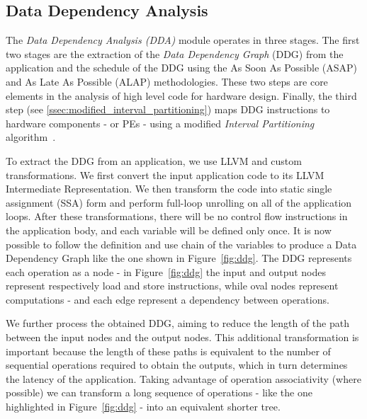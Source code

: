 \vspace{-1mm}
\subsection{Data Dependency Analysis}
\label{ssec:dda}
\vspace{-1mm}
The \textit{Data Dependency Analysis (DDA)} module operates in three stages. The first two stages are the extraction of the \textit{Data Dependency Graph} (DDG)\cite{isoda1983global} from the application and the schedule of the DDG using the As Soon As Possible (ASAP) and As Late As Possible (ALAP) methodologies. These two steps are core elements in the analysis of high level code for hardware design\cite{hwang1991formal}. Finally, the third step (see \ref{ssec:modified_interval_partitioning}) maps DDG instructions to hardware components - or PEs - using a modified \textit{Interval Partitioning} algorithm~\cite{greedyIntervalPartitioning}.

To extract the DDG from an application, we use LLVM  and custom transformations. We first convert the input application code to its LLVM Intermediate Representation. We then transform the code into static single assignment (SSA) form and perform full-loop unrolling on all of the application loops. After these transformations, there will be no control flow instructions in the application body, and each variable will be defined only once. It is now possible to follow the definition and use chain of the variables to produce a Data Dependency Graph like the one shown in Figure~\ref{fig:ddg}. The DDG represents each operation as a node - in Figure~\ref{fig:ddg} the input and output nodes represent respectively load and store instructions, while oval nodes represent computations - and each edge represent a dependency between operations.

We further process the obtained DDG, aiming to reduce the length of the path between the input nodes and the output nodes. This additional transformation is important because the length of these paths is equivalent to the number of sequential operations required to obtain the outputs, which in turn determines the latency of the application. Taking advantage of operation associativity (where possible) we can transform a long sequence of operations - like the one highlighted in Figure~\ref{fig:ddg} - into an equivalent shorter tree.

